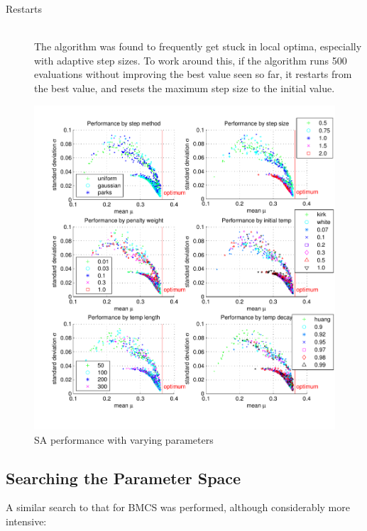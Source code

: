 \documentclass[10pt]{article}
\begin{document}
\begin{description}
  \item[Restarts] \hfill \\
    The algorithm was found to frequently get stuck in local optima,
    especially with adaptive step sizes. To work around this, if the algorithm
    runs 500 evaluations without improving the best value seen so far, it
    restarts from the best value, and resets the maximum step size to the
    initial value.

\end{description}

\begin{figure}[tbp]
  \advance\leftskip-1cm
  \includegraphics[clip, trim=1cm 0.75cm 0cm 0.75cm, width=18.5cm]{sa_perf_scatters.pdf}
  \caption{SA performance with varying parameters}
  \label{fig:sa_perf_scatters}
  \end{figure}

\subsection{Searching the Parameter Space}

A similar search to that for BMCS was performed, although considerably more
intensive:
\end{document}
